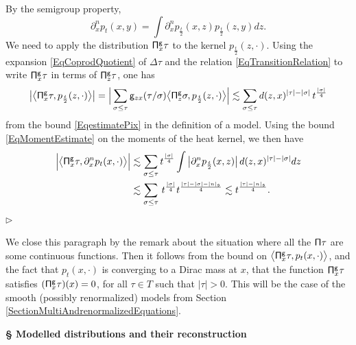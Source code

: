 \documentclass[10pt, reqno]{amsart}
\numberwithin{subsection}{section}
\numberwithin{subsubsection}{subsection}
\numberwithin{equation}{section} %
\newenvironment{Dem}[1][\unskip]{%
    \begin{list}{\hspace{1.15cm}{\sf \textbf{{\small Proof #1 --}}}}{%
        \setlength{\topsep}{0pt}%
        \setlength{\leftmargin}{0pt}%
        \setlength{\rightmargin}{0pt}%
        \setlength{\listparindent}{0pt}%
        \setlength{\itemindent}{0pt}%
        \setlength{\parsep}{0pt}%
        \addtolength{\leftmargin}{0pt}%
        \addtolength{\rightmargin}{0pt}%
    } \item }{\hfill $\rhd$\end{list}\smallskip}
\theoremstyle{mystyle}
\theoremstyle{mystyle2}
\theoremstyle{mystyle3}
\begin{document}
\begin{Dem}
By the semigroup property,
$$
\partial_x^np_t(x,y)=\int\partial_x^np_{\frac{t}2}(x,z)p_{\frac{t}2}(z,y)dz.
$$
We need to apply the distribution ${\sf\Pi}_x^{\sf g}\tau$ to the kernel $p_{\frac{t}2}(z,\cdot)$. Using the expansion \eqref{EqCoprodQuotient} of $\Delta\tau$ and the relation \eqref{EqTransitionRelation} to write ${\sf \Pi}_x^{\sf g}\tau$ in terms of ${\sf \Pi}_z^{\sf g}\tau$, one has
\begin{align*}
\big\vert \big\langle {\sf\Pi}_x^{\sf g}\tau, p_{\frac{t}2}(z,\cdot) \big\rangle \big\vert = \Big\vert\sum_{\sigma\le\tau} {\sf g}_{zx}(\tau/\sigma) \big\langle {\sf\Pi}_z^{\sf g}\sigma, p_{\frac{t}2}(z,\cdot) \big\rangle\Big\vert \lesssim \sum_{\sigma\le \tau} d(z,x)^{|\tau|-|\sigma|}\, t^{\frac{|\sigma|}{4}}
\end{align*}
from the bound \eqref{EqestimatePix} in the definition of a model. Using the bound \eqref{EqMomentEstimate} on the moments of the heat kernel, we then have
\begin{align*}
\Big|\big\langle{\sf\Pi}_x^{\sf g}\tau , \partial_x^n p_t(x,\cdot) \big\rangle\Big|
&\lesssim \sum_{\sigma\le \tau} t^{\frac{|\sigma|}{4}} \int \big\vert\partial_x^np_{\frac{t}2}(x,z)\big\vert \, d(z,x)^{|\tau|-|\sigma|} dz \\
&\lesssim \sum_{\sigma\le \tau} \,t^{\frac{|\sigma|}{4}} t^{\frac{|\tau|-|\sigma|-|n|_{\frak{s}}}{4}}
\lesssim t^{\frac{|\tau|-|n|_{\frak{s}}}{4}}.
\end{align*}
\end{Dem}

\medskip

We close this paragraph by the remark about the situation where all the ${\sf \Pi}\tau$ are some continuous functions. Then it follows from the bound on $\big\langle{\sf\Pi}_x^{\sf g}\tau , p_t(x,\cdot) \big\rangle$, and the fact that $p_t(x,\cdot)$ is converging to a Dirac mass at $x$, that the function ${\sf \Pi}^{\sf g}_x\tau$ satisfies $({\sf \Pi}^{\sf g}_x\tau)(x) = 0$, for all $\tau\in T$ such that $\vert\tau\vert>0$. This will be the case of the smooth (possibly renormalized) 
models from Section \ref{SectionMultiAndrenormalizedEquations}. 



\bigskip



\hfill \textsf{\textbf{ {\Large \S} Modelled distributions and their reconstruction}}
\end{document}
